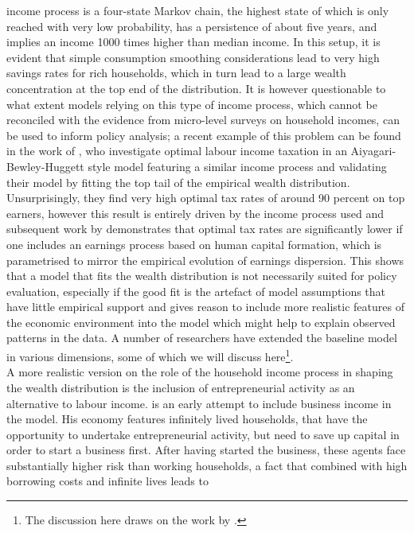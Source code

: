income process is a four-state Markov chain, the highest state of which is only
reached with very low probability, has a persistence of about five years, and
implies an income 1000 times higher than median income. In this setup, it is evident
that simple consumption smoothing considerations lead to very high savings rates
for rich households, which in turn lead to a large wealth concentration at the 
top end of the distribution. It is however questionable to what extent models 
relying on this type of income process, which cannot be reconciled with the 
evidence from micro-level surveys on household incomes, can be used to inform 
policy analysis; a recent example of this problem can be found in the work of 
\cite{KindermannKrueger2014}, who investigate optimal labour income taxation
in an Aiyagari-Bewley-Huggett style model featuring a similar income process and
validating their model by fitting the top tail of the empirical wealth distribution.
Unsurprisingly, they find very high optimal tax rates of around 90 percent on 
top earners, however this result is entirely driven by the income process used
and subsequent work by \cite{BadelHuggett2014} demonstrates that optimal tax
rates are significantly lower if one includes an earnings process based on 
human capital formation, which is parametrised to mirror the empirical evolution
of earnings dispersion.
This shows that a model that fits the wealth distribution is not necessarily 
suited for policy evaluation, especially if the good fit is the artefact of
model assumptions that have little empirical support and gives reason to 
include more realistic features of the economic environment into the model 
which might help to explain observed patterns in the data. A number of researchers
have extended the baseline model in various dimensions, some of which we will 
discuss here\footnote{The discussion here draws on the work by \cite{DeNardi2015}.}.
\vspace{0.5cm}\\
A more realistic version on the role of the household income process in shaping
the wealth distribution is the inclusion of entrepreneurial activity as an
alternative to labour income. \citet{Quadrini2000} is an early attempt to 
include business income in the model. His economy features infinitely lived 
households, that have the opportunity to undertake entrepreneurial activity, but
need to save up capital in order to start a business first. After having started
the business, these agents face substantially higher risk than working households,
a fact that combined with high borrowing costs and infinite lives leads to 
